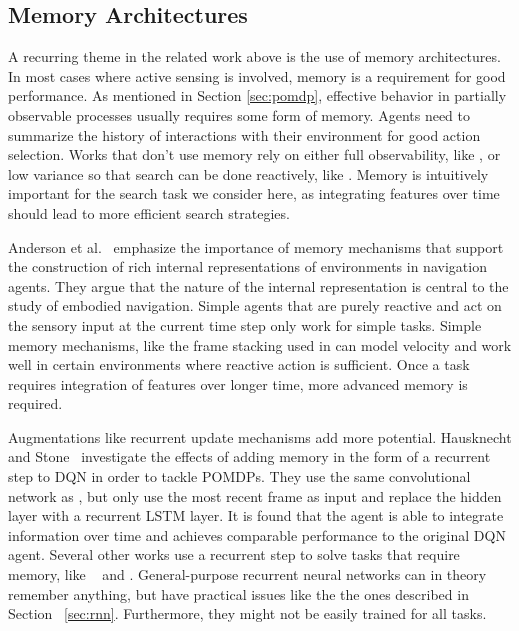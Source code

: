 
\subsection{Memory Architectures}

A recurring theme in the related work above is the use of memory architectures.
In most cases where active sensing is involved, memory is a requirement for good performance.
As mentioned in Section \ref{sec:pomdp}, effective behavior in partially observable processes usually requires some form of memory.
Agents need to summarize the history of interactions with their environment for good action selection.
Works that don't use memory rely on either full observability, like \cite{caicedo_active_2015}, or low variance so that search can be done reactively, like \cite{ourselin_artificial_2016}.
Memory is intuitively important for the search task we consider here, as integrating features over time should lead to more efficient search strategies.

Anderson et al.~\cite{anderson_evaluation_2018} emphasize the importance of memory mechanisms that support the construction of rich internal representations of environments in navigation agents.
They argue that the nature of the internal representation is central to the study of embodied navigation.
Simple agents that are purely reactive and act on the sensory input at the current time step only work for simple tasks.
Simple memory mechanisms, like the frame stacking used in \cite{mnih_human-level_2015} can model velocity and work well in certain environments where reactive action is sufficient.
Once a task requires integration of features over longer time, more advanced memory is required.

Augmentations like recurrent update mechanisms add more potential.
Hausknecht and Stone~\cite{hausknecht_deep_2017} investigate the effects of adding memory in the form of a recurrent step to DQN in order to tackle POMDPs.
They use the same convolutional network as \cite{mnih_human-level_2015}, but only use the most recent frame as input and replace the hidden layer with a recurrent LSTM layer.
It is found that the agent is able to integrate information over time and achieves comparable performance to the original DQN agent.
Several other works use a recurrent step to solve tasks that require memory, like ~\cite{mnih_recurrent_2014} and \cite{mnih_asynchronous_2016}.
General-purpose recurrent neural networks can in theory remember anything, but have practical issues like the the ones described in Section ~\ref{sec:rnn}.
Furthermore, they might not be easily trained for all tasks.

